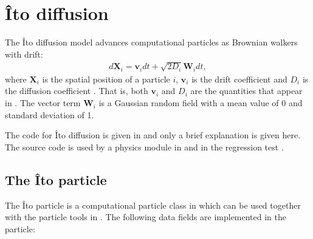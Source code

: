 \documentclass[letterpaper,10pt,english]{sphinxmanual}
\begin{document}
\section{Îto diffusion}
\label{\detokenize{Solvers/Ito:ito-diffusion}}\label{\detokenize{Solvers/Ito:chap-itodiffusion}}\label{\detokenize{Solvers/Ito::doc}}
The Îto diffusion model advances computational particles as Brownian walkers with drift:
\begin{equation*}
\begin{split}d\mathbf{X}_i = \mathbf{v}_idt + \sqrt{2D_i}\mathbf{W}_i dt,\end{split}
\end{equation*}
where \(\mathbf{X}_i\) is the spatial position of a particle \(i\), \(\mathbf{v}_i\) is the drift coefficient and \(D_i\) is the diffusion coefficient .
That is, both \(\mathbf{v}_i\) and \(D_i\) are the quantities that appear in {\hyperref[\detokenize{Solvers/CDR:chap-cdr}]{}}.
The vector term \(\mathbf{W}_i\) is a Gaussian random field with a mean value of 0 and standard deviation of 1.

The code for Îto diffusion is given in  and only a brief explanation is given here.
The source code is used by a physics module in  and in the regression test .


\subsection{The Îto particle}
\label{\detokenize{Solvers/Ito:the-ito-particle}}\label{\detokenize{Solvers/Ito:chap-ito-particle}}
The Îto particle is a computational particle class in  which can be used together with the particle tools in .
The following data fields are implemented in the particle:

\begin{sphinxVerbatim}[commandchars=\\\{\},formatcom=\scriptsize]
 
 
 
 
\end{sphinxVerbatim}
\end{document}

